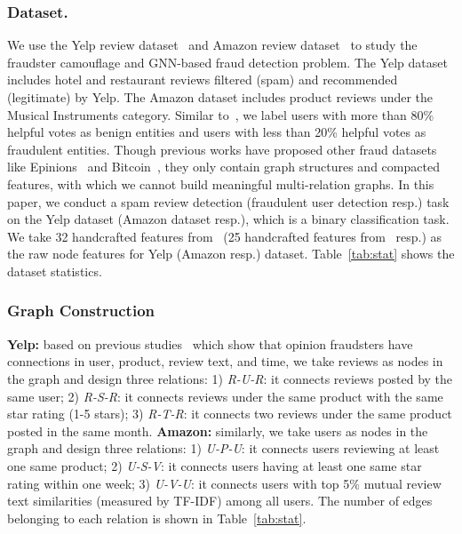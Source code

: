\subsubsection{Dataset.}
We use the Yelp review dataset~\cite{Rayana2015} and Amazon review dataset~\cite{mcauley2013amateurs} to study the fraudster camouflage and GNN-based fraud detection problem.
The Yelp dataset includes hotel and restaurant reviews filtered (spam) and recommended (legitimate) by Yelp.
The Amazon dataset includes product reviews under the Musical Instruments category.
Similar to~\cite{zhang2020gcn}, we label users with more than 80\% helpful votes as benign entities and users with less than 20\% helpful votes as fraudulent entities.
Though previous works have proposed other fraud datasets like Epinions~\cite{kumar2018rev2} and Bitcoin~\cite{weber2019anti}, they only contain graph structures and compacted features, with which we cannot build meaningful multi-relation graphs.
In this paper, we conduct a spam review detection (fraudulent user detection resp.) task on the Yelp dataset (Amazon dataset resp.), which is a binary classification task.
We take 32 handcrafted features from~\cite{Rayana2015} (25 handcrafted features from~\cite{zhang2020gcn} resp.) as the raw node features for Yelp (Amazon resp.) dataset.
Table~\ref{tab:stat} shows the dataset statistics.


\subsubsection{Graph Construction}
\label{sec05:graph_build}
\noindent \textbf{Yelp:} based on previous studies~\cite{Rayana2015, Mukherjee:2013uk} which show that opinion fraudsters have connections in user, product, review text, and time,
we take reviews as nodes in the graph and design three relations: 1) \textit{R-U-R}: it connects reviews posted by the same user; 2) \textit{R-S-R}: it connects reviews under the same product with the same star rating (1-5 stars); 3) \textit{R-T-R}: it connects two reviews under the same product posted in the same month.
\textbf{Amazon:} similarly, we take users as nodes in the graph and design three relations: 1) \textit{U-P-U}: it connects users reviewing at least one same product; 2) \textit{U-S-V}: it connects users having at least one same star rating within one week; 3) \textit{U-V-U}: it connects users with top 5\% mutual review text similarities (measured by TF-IDF) among all users.
The number of edges belonging to each relation is shown in Table~\ref{tab:stat}.


